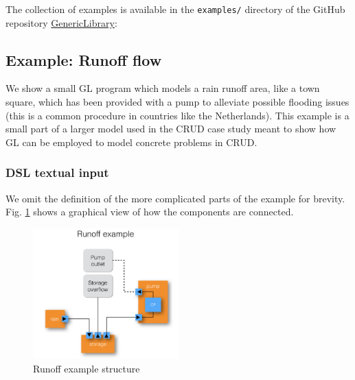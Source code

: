 The collection of examples is available in the \verb+examples/+ directory of the GitHub repository \href{https://github.com/GRACeFUL-project/GenericLibrary}{GenericLibrary}:


\subsection{Example: Runoff flow}
\label{example-runoff-flow}

We show a small GL program which models a rain runoff area, like a
town square, which has been provided with a pump to alleviate possible
flooding issues (this is a common procedure in countries like the
Netherlands).
%
This example is a small part of a larger model used in the CRUD case
study meant to show how GL can be employed to model concrete problems
in CRUD.


\subsubsection{DSL textual input}
\label{example-runoff-flow-dsl-textual-input}

We omit the definition of the more complicated parts of the example
for brevity.
%
Fig. \ref{fig:RunoffEx} shows a graphical view of how the components
are connected.
%
\begin{figure}[htbp]
  \centering
\includegraphics[width=0.5\textwidth]{fig/RunoffExample.jpg}
  \caption{Runoff example structure}
  \label{fig:RunoffEx}
\end{figure}

